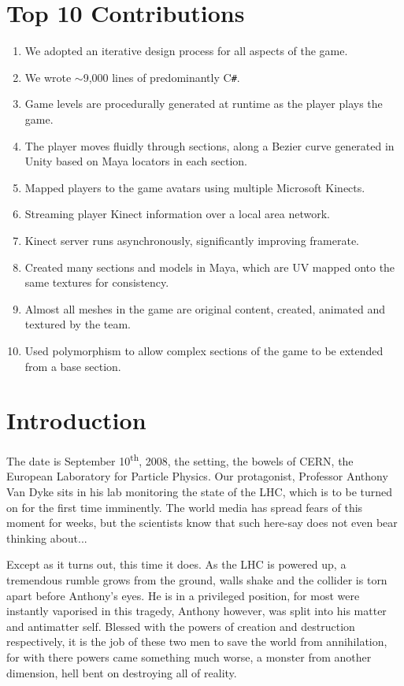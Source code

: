 \documentclass[a4paper,oneside]{memoir}
\begin{document}
	\chapter*{Top 10 Contributions}
		\begin{enumerate}
			\item We adopted an iterative design process for all aspects of the game.
			\item We wrote $\sim$9,000 lines of predominantly C\texttt{\#}.
			\item Game levels are procedurally generated at runtime as the player plays the game.
			\item The player moves fluidly through sections, along a Bezier curve generated in Unity based on Maya locators in each section.
			\item Mapped players to the game avatars using multiple Microsoft Kinects.
			\item Streaming player Kinect information over a local area network.
			\item Kinect server runs asynchronously, significantly improving framerate.
			\item Created many sections and models in Maya, which are UV mapped onto the same textures for consistency.
			\item Almost all meshes in the game are original content, created, animated and textured by the team.
			\item Used polymorphism to allow complex sections of the game to be extended from a base section.
		\end{enumerate}

	\chapter{Introduction}

		The date is September 10\textsuperscript{th}, 2008, the setting, the bowels of CERN, the European Laboratory for Particle Physics.
		Our protagonist, Professor Anthony Van Dyke sits in his lab monitoring the state of the LHC, which is to be turned on for the first time imminently.
		The world media has spread fears of this moment for weeks, but the scientists know that such here-say does not even bear thinking about...

		Except as it turns out, this time it does. As the LHC is powered up, a tremendous rumble grows from the ground, walls shake and the collider is torn apart before Anthony's eyes.
		He is in a privileged position, for most were instantly vaporised in this tragedy, Anthony however, was split into his matter and antimatter self.
		Blessed with the powers of creation and destruction respectively, it is the job of these two men to save the world from annihilation, for with there powers came something much worse, a monster from another dimension, hell bent on destroying all of reality.
\end{document}
